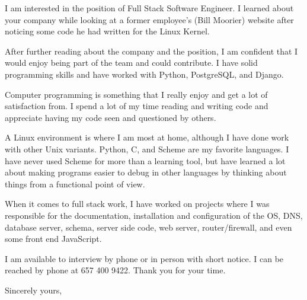 \documentclass{letter}
\begin{document}
\begin{letter}{}

I am interested in the position of Full Stack Software Engineer.  I
learned about your company while looking at a former
employee's (Bill Moorier) website after noticing some code he had
written for the Linux Kernel.

After further reading about the company and the position, I am confident
that I would enjoy being part of the team and could contribute.  I
have solid programming skills and have worked with Python, PostgreSQL,
and Django.

Computer programming is something that I really enjoy and get a lot
of satisfaction from.  I spend a lot of my time reading and writing code
and appreciate having my code seen and questioned by others.

A Linux environment is where I am most at home, although I have
done work with other Unix variants.  Python, C, and Scheme are my
favorite languages.  I have never used Scheme for more than a learning tool,
but have learned a lot about making programs easier to debug in other
languages by thinking about things from a functional point of view.

When it comes to full stack work, I have worked on projects where
I was responsible for the documentation, installation and
configuration of the OS, DNS, database server, schema, server side code,
web server, router/firewall, and even some front end JavaScript.

I am available to interview by phone or in person with short notice.  I
can be reached by phone at 657 400 9422.  Thank you for your time.

\closing{Sincerely yours,}
\end{letter}
\end{document}

